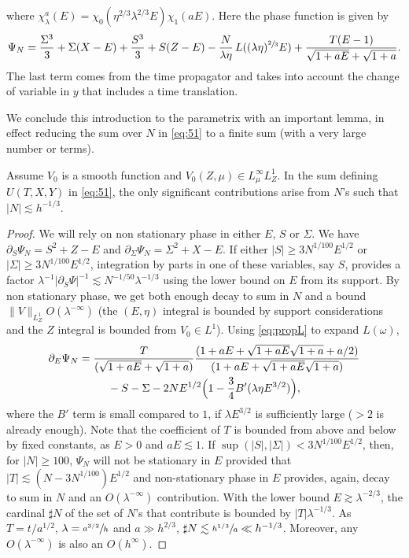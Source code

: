 where $\chi_{\lambda}^{a}(E)=\chi_{0}(\eta^{2/3} \lambda^{2/3} E)\chi_{1}(a E)$. Here the phase function is given by
\begin{equation*}
\label{eq:52}
\Psi_{N}=\frac{\Sigma^{3}}3 +\Sigma(X-E)+\frac {S^{3}} 3+S({Z}-E)-\frac N{\lambda \eta}\, L((\lambda \eta)^{\sfrac 2 3} E)+\frac { T(E-1)}{\sqrt {1+a E}+\sqrt{1+a}}.
\end{equation*}
The last term comes from the time propagator and takes into account the change of variable in $y$ that includes a time translation.

We conclude this introduction to the parametrix with an important lemma, in effect reducing the sum over $N$ in \eqref{eq:51} to a finite sum (with a very large number or terms).
\begin{lemma}\label{sumNfinie}
Assume $V_{0}$ is a smooth function and $V_{0}(Z,\mu)\in L^{\infty}_{\mu}L^{1}_{Z}$. In the sum defining $U(T,X,Y)$ in \eqref{eq:51}, the only significant contributions arise from $N$'s such that $|N|\lesssim h^{-1/3}$.
\end{lemma}
\begin{proof}
We will rely on non stationary phase in either $E$, $S$ or $\Sigma$. We have $\partial_{S}\Psi_{N}=S^{2}+Z-E$ and $\partial_{\Sigma}\Psi_{N}=\Sigma^{2}+X-E$. If either $|S|\geq 3 N^{1/100} E^{1/2} $ or $|\Sigma|\geq 3 N^{1/100}E^{1/2}$, integration by parts in one of these variables, say $S$, provides a factor $\lambda^{-1}|\partial_{S} \Psi|^{-1}\lesssim N^{-1/50}\lambda^{-1/3}$ using the lower bound on $E$ from its support. By non stationary phase, we get both enough decay to sum in $N$ and a bound $\|V\|_{L^{1}_{Z}} O(\lambda^{-\infty})$ (the $(E,\eta)$ integral is bounded by support considerations and the $Z$ integral is bounded from $V_{0}\in L^{1}$). Using \eqref{eq:propL} to expand $L(\omega)$,
\begin{multline*}
\partial_{E}\Psi_{N}=\frac T {(\sqrt{1+aE}+\sqrt{1+a})}\frac{(1+aE+\sqrt{1+aE}\sqrt{1+a} +a/2)}{(1+aE +\sqrt{1+aE}\sqrt{1+a})} \\
{}-S -\Sigma-2NE^{1/2}\Bigl(1-\frac 3 4 B'(\lambda \eta E^{3/2}) \Bigr),
\end{multline*}
where the $B'$ term is small compared to $1$, if $\lambda E^{3/2}$ is sufficiently large ($>2$ is already enough). Note that the coefficient of $T$ is bounded from above and below by fixed constants, as $E>0$ and $aE\lesssim 1$.
If $\sup(|S|,|\Sigma|)<3 N^{1/100}E^{1/2}$, then, for $|N|\geq 100$, $\Psi_{N}$ will not be stationary in $E$ provided that $|T|\lesssim (N-3N^{1/100}) E^{1/2} $ and non-stationary phase in $E$ provides, again, decay to sum in $N$ and an $O(\lambda^{-\infty})$ contribution. With the lower bound $E\gtrsim \lambda^{-2/3}$, the cardinal $\sharp N$ of the set of $N$'s that contribute is bounded by $|T| \lambda^{-1/3}$. As $T=t/a^{1/2}$, $\lambda=\sfrac{a^{3/2}}{h}$ and $a\gg h^{2/3}$, $\sharp N\lesssim \sfrac{h^{1/3}}{a}\ll h^{-1/3}$. Moreover, any $O(\lambda^{-\infty})$ is also an $O(h^{\infty})$. \end{proof}

